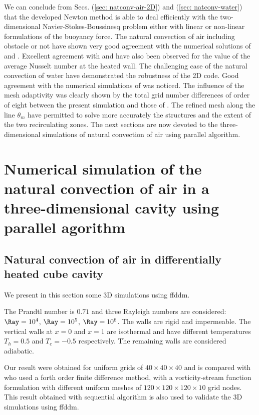 We can conclude from Secs. (\ref{sec: natconv-air-2D}) and (\ref{sec: natconv-water}) that the developed Newton method is able to deal  efficiently with the two-dimensional Navier-Stokes-Boussinesq problem either with linear or non-linear formulations of the buoyancy force.
The natural convection of air including obstacle or not have shown very good agreement with the numerical solutions of \cite{LeQuere91} and \cite{Raluca2013}.
Excellent agreement with \cite{de1983natural} and \cite{LeQuere91} have also been observed for the value of the average Nusselt number at the heated wall. 
The challenging case of the natural convection of water have demonstrated the robustness of the 2D code. 
Good agreement with the numerical simulations of \cite{Kowalewski-2003} was noticed. 
The influence of the mesh adaptivity was clearly shown by the total grid number differences of order of eight between the present simulation and those of \cite{Kowalewski-2003} .
The refined mesh along the line $\theta_m$ have permitted to solve more accurately the structures and the extent of the two recirculating zones.
The next sections are now devoted to the three-dimensional simulations of natural convection of air using parallel algorithm.

\newpage
\section{Numerical simulation of the natural convection of air in a three-dimensional cavity using parallel agorithm}\label{sec: natconv-air-3D}

\subsection{Natural convection of air in differentially heated cube cavity}
We present in this section some 3D simulations using ffddm.

The Prandtl number is $0.71$ and three Rayleigh numbers are considered:  $\Ray=10^4$, $\Ray=10^5$, $\Ray=10^6$. The walls are rigid and impermeable. The vertical walls at $x=0$ and $x=1$ are isothermal and have different temperatures $T_h=0.5$ and $T_c=-0.5$ respectively. The remaining walls are considered adiabatic. %
 
Our result were obtained for uniform grids of $  40 \times 40 \times 40$ and is compared with \cite{Wakashima-2004} who used a forth order finite difference method, with a vorticity-stream function formulation with different uniform meshes of  $120 \times 120 \times 120 \times 10$ grid nodes. 
This result obtained with sequential algorithm is also used to validate the 3D simulations using ffddm.

